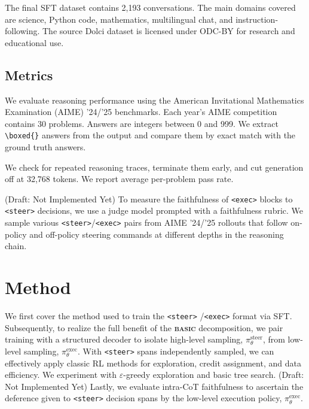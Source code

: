 \documentclass[10pt,twocolumn]{article}
\newcommand{\methodname}{\textbf{\textsf{\textsc{basic}}}}
\newcommand{\methodname}{{\sffamily\bfseries{\fontsize{0.95em}{0.95em}\selectfont BASIC}}}
\begin{document}
The final SFT dataset contains 2,193 conversations. The main domains covered are
science, Python code, mathematics, multilingual chat, and instruction-following.
The source Dolci dataset is licensed under ODC-BY for research and educational use.

\subsection{Metrics}
\label{sec:metrics}

We evaluate reasoning performance using the American Invitational Mathematics
Examination (AIME) '24/'25 benchmarks. Each year's AIME competition contains
30 problems. Answers are integers between 0 and 999. We extract
\verb|\boxed{}|
answers from the output and compare them by exact match with the ground truth answers.

We check for repeated reasoning traces, terminate them early, and cut generation off
at 32,768 tokens. We report average per-problem pass rate.

(Draft: Not Implemented Yet)
\begingroup
\color{red!80!black}
To measure the faithfulness of \texttt{<exec>} blocks to
\texttt{<steer>} decisions, we use a judge model prompted with a
faithfulness
rubric. We sample various \texttt{<steer>}/\texttt{<exec>} pairs
from
AIME '24/'25 rollouts that follow on-policy and off-policy steering commands at
different depths in the reasoning chain.
\par
\endgroup

\section{Method}
\label{sec:method}

We first cover the method used to train the \texttt{<steer>}
/\texttt{<exec>} format via SFT. Subsequently, to
realize the full benefit of the \methodname{} decomposition, we pair
training with a
structured decoder to isolate high-level sampling, \(\pi_\theta^{\text{steer}}\),
from low-level sampling, \(\pi_\theta^{\text{exec}}\). With
\texttt{<steer>} spans independently sampled, we can
effectively apply classic RL methods for exploration, credit assignment, and data
efficiency. We experiment with \(\varepsilon\)-greedy exploration and basic tree
search. (Draft: Not Implemented Yet)
\begingroup
\color{red!80!black}
Lastly, we evaluate intra-CoT faithfulness to ascertain the deference
given to \texttt{<steer>} decision spans by the low-level execution policy,
\(\pi_\theta^{\text{exec}}\).
\endgroup
\end{document}
